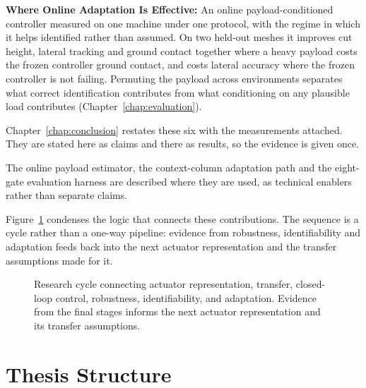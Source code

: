 \textbf{Where Online Adaptation Is Effective:} An online payload-conditioned
controller measured on one machine under one protocol, with the regime in which
it helps identified rather than assumed. On two held-out meshes it improves cut
height, lateral tracking and ground contact together where a heavy payload costs
the frozen controller ground contact, and costs lateral accuracy where the
frozen controller is not failing. Permuting the payload across environments separates
what correct identification contributes from what conditioning on any plausible
load contributes (Chapter~\ref{chap:evaluation}).

Chapter~\ref{chap:conclusion} restates these six with the measurements attached.
They are stated here as claims and there as results, so the evidence is given
once.

The online payload estimator, the context-column adaptation path and the
eight-gate evaluation harness are described where they are used, as technical
enablers rather than separate claims.

Figure~\ref{fig:intro:research-cycle} condenses the logic that connects these
contributions. The sequence is a cycle rather than a one-way pipeline: evidence
from robustness, identifiability and adaptation feeds back into the next
actuator representation and the transfer assumptions made for it.

\begin{figure}[H]
  \centering
  \resizebox{.80\textwidth}{!}{}
  \caption{Research cycle connecting actuator representation, transfer,
  closed-loop control, robustness, identifiability, and adaptation. Evidence
  from the final stages informs the next actuator representation and its transfer
  assumptions.}
  \label{fig:intro:research-cycle}
\end{figure}

\section{Thesis Structure}
\label{sec:intro:structure}

